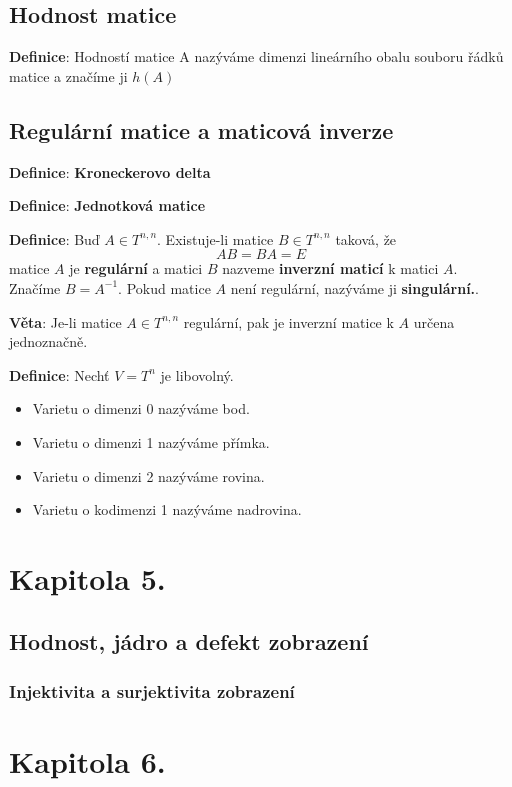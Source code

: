 \documentclass[12pt, letterpaper, twoside]{article}
\begin{document}
\subsection{Hodnost matice}

\textbf{Definice}: Hodností matice A nazýváme dimenzi lineárního obalu souboru řádků matice a značíme ji $h(A)$

\subsection{Regulární matice a maticová inverze}

\textbf{Definice}: \textbf{Kroneckerovo delta}

\textbf{Definice}: \textbf{Jednotková matice}

\textbf{Definice}: Buď $A \in T^{n,n}$. Existuje-li matice $B \in T^{n,n}$ taková, že
\[
    AB = BA = E
\] matice $A$ je \textbf{regulární} a matici $B$ nazveme \textbf{inverzní maticí} k matici $A$.
Značíme $B = A^{-1}$. Pokud matice $A$ není regulární, nazýváme ji \textbf{singulární.}.

\textbf{Věta}: Je-li matice $A \in T^{n,n}$ regulární, pak je inverzní matice k $A$ určena jednoznačně.

\textbf{Definice}: Nechť $V = T^n$ je libovolný.
\begin{itemize}
    \item Varietu o dimenzi 0 nazýváme bod.
    \item Varietu o dimenzi 1 nazýváme přímka.
    \item Varietu o dimenzi 2 nazýváme rovina.
    \item Varietu o kodimenzi 1 nazýváme nadrovina.
\end{itemize}

\section{Kapitola 5.}
\subsection{Hodnost, jádro a defekt zobrazení}
\subsubsection{Injektivita a surjektivita zobrazení}

\section{Kapitola 6.}
\end{document}
